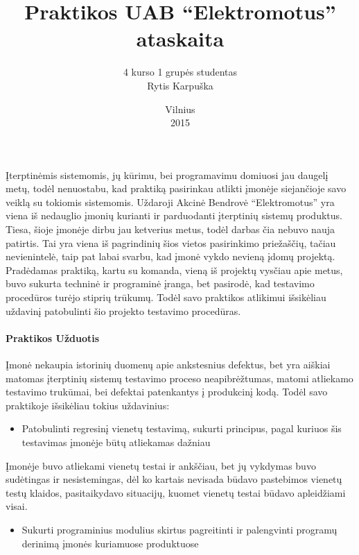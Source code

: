 \documentclass[12pt, a4paper, lithuanian, final]{article}
\title{Praktikos UAB "`Elektromotus"' ataskaita}
\author{
    4 kurso 1 grupės studentas \\
    Rytis Karpuška
}
\date{Vilnius \\
	2015}
\begin{document}
\maketitle
\tableofcontents


Įterptinėmis sistemomis, jų kūrimu, bei programavimu domiuosi jau daugelį metų, todėl nenuostabu, kad praktiką pasirinkau atlikti įmonėje siejančioje savo veiklą su tokiomis sistemomis.
Uždaroji Akcinė Bendrovė "`Elektromotus"' yra viena iš nedauglio įmonių kurianti ir parduodanti įterptinių sistemų produktus.
Tiesa, šioje įmonėje dirbu jau ketverius metus, todėl darbas čia nebuvo nauja patirtis.
Tai yra viena iš pagrindinių šios vietos pasirinkimo priežaščių, tačiau nevienintelė, taip pat labai svarbu, kad įmonė vykdo nevieną įdomų projektą.
Pradėdamas praktiką, kartu su komanda, vieną iš projektų vysčiau apie metus, buvo sukurta techninė ir programinė įranga, bet pasirodė, kad testavimo procedūros turėjo stiprių trūkumų.
Todėl savo praktikos atlikimui išsikėliau uždavinį patobulinti šio projekto testavimo procedūras.


\paragraph{Praktikos Užduotis}

Įmonė nekaupia istorinių duomenų apie ankstesnius defektus, bet yra aiškiai matomas įterptinių sistemų testavimo proceso neapibrėžtumas, matomi atliekamo testavimo trukūmai, bei defektai patenkantys į produkcinį kodą.
Todėl savo praktikoje išsikėliau tokius uždavinius:
\begin{itemize}
	\item Patobulinti regresinį vienetų testavimą, sukurti principus, pagal kuriuos šis testavimas įmonėje būtų atliekamas dažniau
\end{itemize}

Įmonėje buvo atliekami vienetų testai ir ankščiau, bet jų vykdymas buvo sudėtingas ir nesistemingas, dėl ko kartais nevisada būdavo pastebimos vienetų testų klaidos, pasitaikydavo situacijų, kuomet vienetų testai būdavo apleidžiami visai.

\begin{itemize}
	\item Sukurti programinius modulius skirtus pagreitinti ir palengvinti programų derinimą įmonės kuriamuose produktuose
\end{itemize}
\end{document}
